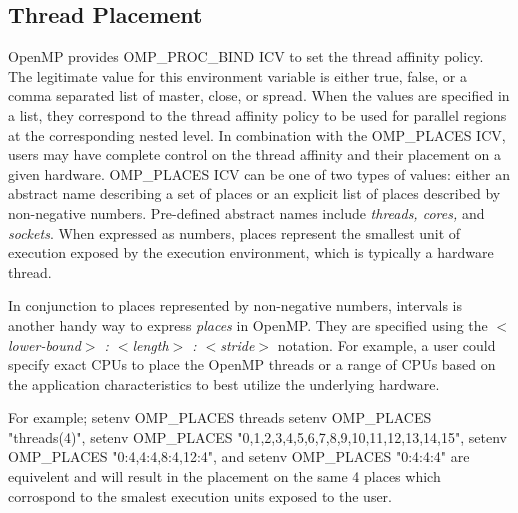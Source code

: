 \subsection{Thread Placement}
OpenMP provides OMP\_PROC\_BIND ICV to set the thread affinity policy. The legitimate value for 
this environment variable is either true, false, or a comma separated list of master, close, or spread. 
When the values are specified in a list, they correspond to the thread affinity policy to be used for 
parallel regions at the corresponding nested level. In combination with the OMP\_PLACES ICV, 
users may have complete control on the thread affinity and their placement on a given hardware. 
OMP\_PLACES ICV can be one of two types of values: either an abstract name describing a set 
of places or an explicit list of places described by non-negative numbers. Pre-defined abstract 
names include \textit{threads, cores,} and \textit{sockets}. When expressed as numbers, places 
represent the smallest unit of execution exposed by the execution environment, which is typically 
a hardware thread.

In conjunction to places represented by non-negative numbers, intervals is another handy way to 
express \textit{places} in OpenMP. They are specified using the \textit{$<$lower-bound$>$ : $<$length$>$ : $<$stride$>$} notation. For example, a user could specify exact CPUs to place the OpenMP threads or a range of CPUs based on the application characteristics to best utilize the underlying hardware.

For example; setenv OMP\_PLACES threads
setenv OMP\_PLACES "threads(4)", setenv OMP\_PLACES "{0,1,2,3},{4,5,6,7},{8,9,10,11},{12,13,14,15}", setenv OMP\_PLACES "{0:4},{4:4},{8:4},{12:4}", and setenv OMP\_PLACES "{0:4}:4:4" are equivelent and will result in the placement on the same 4 places which corrospond to the smalest execution units exposed to the user.

